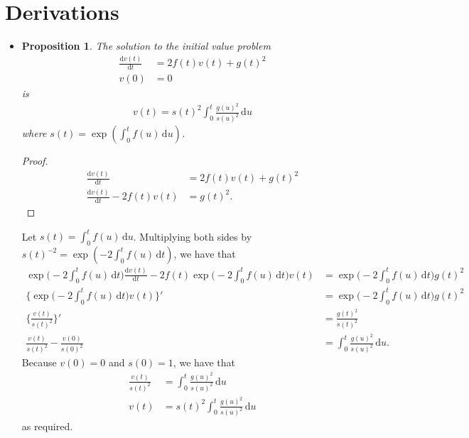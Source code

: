 \documentclass[10pt]{article}
\newtheorem{proposition}[lemma]{Proposition}
\newcommand{\dee}{\mathrm{d}}
\begin{document}
\appendix

\section{Derivations}

\begin{itemize}
  \item \begin{proposition} \label{thm:linear-sde-variance}
    The solution to the initial value problem
    \begin{align*}
      \frac{\dee v(t)}{\dee t} &= 2f(t)v(t) + g(t)^2 \\
      v(0) &= 0      
    \end{align*}
    is
    \begin{align*}
      v(t) = s(t)^2 \int_0^t \frac{g(u)^2}{s(u)^2}\, \dee u
    \end{align*}
    where $s(t) = \exp(\int_0^t f(u)\, \dee u)$.
  \end{proposition}
  \begin{proof}
    \begin{align*}
    \frac{\dee v(t)}{\dee t} &= 2f(t)v(t) + g(t)^2 \\
    \frac{\dee v(t)}{\dee t} - 2f(t)v(t) &= g(t)^2.
    \end{align*}
  \end{proof}
  Let $s(t) = \int_0^t f(u)\, \dee u$.
  Multiplying both sides by $s(t)^{-2} = \exp(-2\int_0^t f(u)\, \dee t)$, we have that
  \begin{align*}
    \exp\bigg( -2 \int_0^t f(u)\, \dee t \bigg) \frac{\dee v(t)}{\dee t}
    - 2f(t) \exp\bigg( -2 \int_0^t f(u)\, \dee t \bigg) v(t)
    &= \exp\bigg( -2 \int_0^t f(u)\, \dee t \bigg) g(t)^2 \\
    \bigg\{ \exp\bigg( -2 \int_0^t f(u)\, \dee t \bigg) v(t) \bigg\}'
    &= \exp\bigg( -2 \int_0^t f(u)\, \dee t \bigg) g(t)^2 \\
    \bigg\{ \frac{v(t)}{s(t)^2} \bigg\}'
    &= \frac{g(t)^2}{s(t)^2} \\
    \frac{v(t)}{s(t)^2} - \frac{v(0)}{s(0)^2} &= \int_0^t \frac{g(u)^2}{s(u)^2}\, \dee u.
  \end{align*}
  Because $v(0) = 0$ and $s(0) = 1$, we have that
  \begin{align*}
    \frac{v(t)}{s(t)^2} &= \int_0^t \frac{g(u)^2}{s(u)^2}\, \dee u \\
    v(t) &= s(t)^2 \int_0^t \frac{g(u)^2}{s(u)^2}\, \dee u
  \end{align*}
  as required.
\end{itemize}


  
\end{document}
